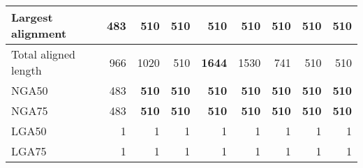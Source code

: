 \documentclass[12pt,a4paper]{article}
\begin{document}
\begin{table}[ht]
\begin{center}
\begin{tabular}{|l*{8}{|r}|}
Largest alignment & 483 & {\bf 510} & {\bf 510} & {\bf 510} & {\bf 510} & {\bf 510} & {\bf 510} & {\bf 510} \\ \hline
Total aligned length & 966 & 1020 & 510 & {\bf 1644} & 1530 & 741 & 510 & 510 \\ \hline
NGA50 & 483 & {\bf 510} & {\bf 510} & {\bf 510} & {\bf 510} & {\bf 510} & {\bf 510} & {\bf 510} \\ \hline
NGA75 & 483 & {\bf 510} & {\bf 510} & {\bf 510} & {\bf 510} & {\bf 510} & {\bf 510} & {\bf 510} \\ \hline
LGA50 & 1 & 1 & 1 & 1 & 1 & 1 & 1 & 1 \\ \hline
LGA75 & 1 & 1 & 1 & 1 & 1 & 1 & 1 & 1 \\ \hline
\end{tabular}
\end{center}
\end{table}
\end{document}
